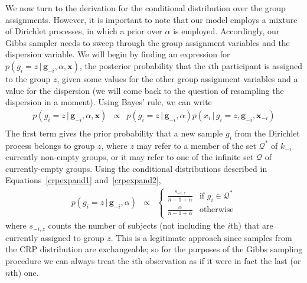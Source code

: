 \documentclass[authoryear]{elsarticle}
\newcommand{\condon}{\,|\,}
\newcommand{\vctr}[1]{\bm{#1}}
\begin{document}
We now turn to the derivation for the conditional distribution over the group
assignments. However, it is important to note that our model employs a mixture
of Dirichlet processes, in which a prior over $\alpha$ is employed. Accordingly,
our Gibbs sampler needs to sweep through the group assignment variables and
the dispersion variable. We will begin by finding an expression for
$p(g_i =z \condon \vctr{g}_{-i}, \alpha, \vctr{x})$,  the posterior probability that
the $i$th participant is assigned to the group $z$, given some values for the other
group assignment variables and a value for the dispersion (we will come back to the
question of resampling the dispersion in a moment). Using Bayes' rule, we can write
\begin{eqnarray*}
        p(g_i=z \condon \vctr{g}_{-i}, \alpha, \vctr{x}) &\propto&
        p(g_i=z \condon \vctr{g}_{-i}, \alpha) p(x_i \condon g_i=z, \vctr{g}_{-i}, \vctr{x}_{-i}) \\
\end{eqnarray*}
The first term gives the prior probability that a new sample $g_i$ from the
Dirichlet process belongs to group $z$, where $z$ may refer to a member of
the set $\mathcal{Q}^*$ of $k_{-i}$ currently non-empty groups, or it may
refer to one of the infinite set $\mathcal{Q}$ of currently-empty groups. Using
the conditional distributions described in Equations~\ref{crpexpand1}
and~\ref{crpexpand2},
\begin{eqnarray}
        p(g_i=z \condon \vctr{g}_{-i}, \alpha) &\propto& \left\{
        \begin{array}{rl}
        \frac{s_{-i,z}}{n-1+\alpha} & \mbox{if }  g_i \in \mathcal{Q}^* \\
        \frac{\alpha}{n-1+\alpha}  & \mbox{otherwise}
        \end{array}
        \right.
        \label{gibbsprior}
\end{eqnarray}
where $s_{-i,z}$ counts the number of subjects (not including the $i$th)
that are currently assigned to group $z$. This is a legitimate approach since
samples from the CRP distribution are exchangeable; so for the purposes of
the Gibbs sampling procedure we can always treat
the $i$th observation as if it were in fact the last (or $n$th) one.
\end{document}
